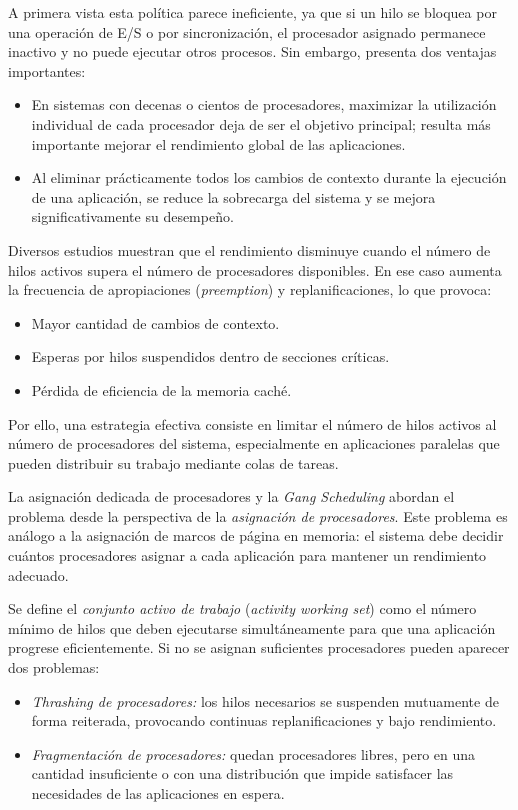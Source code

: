 A primera vista esta política parece ineficiente, ya que si un hilo se bloquea por una operación de E/S o por sincronización, el procesador asignado permanece inactivo y no puede ejecutar otros procesos. Sin embargo, presenta dos ventajas importantes:
\begin{itemize}
  \item En sistemas con decenas o cientos de procesadores, maximizar la utilización individual de cada procesador deja de ser el objetivo principal; resulta más importante mejorar el rendimiento global de las aplicaciones.
  \item Al eliminar prácticamente todos los cambios de contexto durante la ejecución de una aplicación, se reduce la sobrecarga del sistema y se mejora significativamente su desempeño.
\end{itemize}
Diversos estudios muestran que el rendimiento disminuye cuando el número de hilos activos supera el número de procesadores disponibles. En ese caso aumenta la frecuencia de apropiaciones (\textit{preemption}) y replanificaciones, lo que provoca:
\begin{itemize}
  \item Mayor cantidad de cambios de contexto.
  \item Esperas por hilos suspendidos dentro de secciones críticas.
  \item Pérdida de eficiencia de la memoria caché.
\end{itemize}

Por ello, una estrategia efectiva consiste en limitar el número de hilos activos al número de procesadores del sistema, especialmente en aplicaciones paralelas que pueden distribuir su trabajo mediante colas de tareas.

La asignación dedicada de procesadores y la \textit{Gang Scheduling} abordan el problema desde la perspectiva de la \textit{asignación de procesadores}. Este problema es análogo a la asignación de marcos de página en memoria: el sistema debe decidir cuántos procesadores asignar a cada aplicación para mantener un rendimiento adecuado.

Se define el \textit{conjunto activo de trabajo} (\textit{activity working set}) como el número mínimo de hilos que deben ejecutarse simultáneamente para que una aplicación progrese eficientemente. Si no se asignan suficientes procesadores pueden aparecer dos problemas:
\begin{itemize}
  \item \textit{Thrashing de procesadores:} los hilos necesarios se suspenden mutuamente de forma reiterada, provocando continuas replanificaciones y bajo rendimiento.
  \item \textit{Fragmentación de procesadores:} quedan procesadores libres, pero en una cantidad insuficiente o con una distribución que impide satisfacer las necesidades de las aplicaciones en espera.
\end{itemize}

